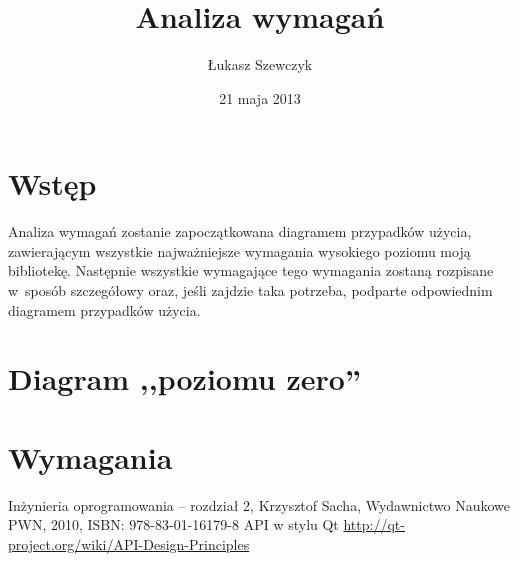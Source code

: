 \documentclass[11pt,twoside,a4paper,final]{article}
\begin{document}
\date{21 maja 2013}
\title{Analiza wymagań}

\author{Łukasz Szewczyk}

\maketitle

\section{Wstęp}
Analiza wymagań zostanie zapoczątkowana diagramem przypadków użycia, zawierającym wszystkie najważniejsze wymagania wysokiego poziomu moją bibliotekę. Następnie wszystkie wymagające tego wymagania zostaną rozpisane w~sposób szczegółowy oraz, jeśli zajdzie taka potrzeba, podparte odpowiednim diagramem przypadków użycia.

\section{Diagram ,,poziomu zero''}

\section{Wymagania}


\begin{thebibliography}{}
Inżynieria oprogramowania -- rozdział 2, Krzysztof Sacha, Wydawnictwo Naukowe PWN, 2010, ISBN: 978-83-01-16179-8
API w stylu Qt \url{http://qt-project.org/wiki/API-Design-Principles}
\end{thebibliography}
\end{document}

